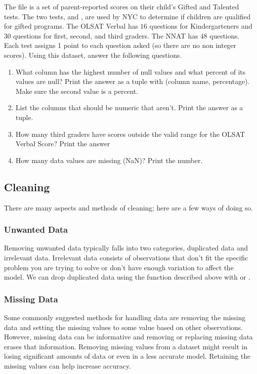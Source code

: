\begin{problem}
The  file is a set of parent-reported scores on their child's Gifted and Talented tests.
The two tests,  and , are used by NYC to determine if children are qualified for gifted programs.
The OLSAT Verbal has $16$ questions for Kindergarteners and 30 questions for first, second, and third graders.
The NNAT has $48$ questions. Each test assigns 1 point to each question asked (so there are no non integer scores).
Using this dataset, answer the following questions.

\begin{enumerate}
\item What column has the highest number of null values and what percent of its values are null? Print the answer as a tuple with (column name, percentage).
Make sure the second value is a percent.

\item List the columns that should be numeric that aren't. Print the answer as a tuple.

\item How many third graders have scores outside the valid range for the OLSAT Verbal Score? Print the answer

\item How many data values are missing (NaN)? Print the number.

\end{enumerate}
\end{problem}

\subsection*{Cleaning}
There are many aspects and methods of cleaning; here are a few ways of doing so.

\subsubsection*{Unwanted Data}
Removing unwanted data typically falls into two categories, duplicated data and irrelevant data.
Irrelevant data consists of observations that don't fit the specific problem you are trying to solve or don't have enough variation to affect the model.
We can drop duplicated data using the  function described above with  or .
\subsubsection*{Missing Data}
Some commonly suggested methods for handling data are removing the missing data and setting the missing values to some value based on other observations.
However, missing data can be informative and removing or replacing missing data erases that information.
Removing missing values from a dataset might result in losing significant amounts of data or even in a less accurate model. Retaining the missing values can help increase accuracy.
\\


